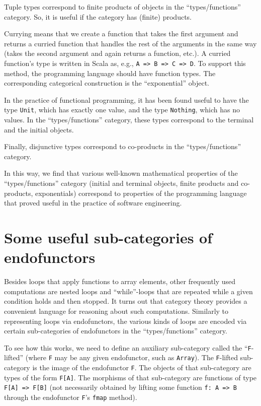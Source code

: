 Tuple types correspond to finite products of objects in the \textsf{``}types/functions\textsf{''}
category. So, it is useful if the category has (finite) products. 

Currying means that we create a function that takes the first argument
and returns a curried function that handles the rest of the arguments
in the same way (takes the second argument and again returns a function,
etc.). A curried function\textsf{'}s type is written in Scala as, e.g., \lstinline!A => B => C => D!.
To support this method, the programming language should have function
types. The corresponding categorical construction is the \textsf{``}exponential\textsf{''}
object. 

In the practice of functional programming, it has been found useful
to have the type \lstinline!Unit!, which has exactly one value, and
the type \lstinline!Nothing!, which has no values. In the \textsf{``}types/functions\textsf{''}
category, these types correspond to the terminal and the initial objects.

Finally, disjunctive types correspond to co-products in the \textsf{``}types/functions\textsf{''}
category.

In this way, we find that various well-known mathematical properties
of the \textsf{``}types/functions\textsf{''} category (initial and terminal objects,
finite products and co-products, exponentials) correspond to properties
of the programming language that proved useful in the practice of
software engineering.

\section{Some useful sub-categories of endofunctors}

Besides loops that apply functions to array elements, other frequently
used computations are nested loops and \textsf{``}while\textsf{''}-loops that are
repeated while a given condition holds and then stopped. It turns
out that category theory provides a convenient language for reasoning
about such computations. Similarly to representing loops via endofunctors,
the various kinds of loops are encoded via certain sub-categories
of endofunctors in the \textsf{``}types/functions\textsf{''} category.

To see how this works, we need to define an auxiliary sub-category
called the \textsf{``}\lstinline!F!-lifted\textsf{''} (where \lstinline!F! may be
any given endofunctor, such as \lstinline!Array!). The \lstinline!F!-lifted
sub-category is the image of the endofunctor \lstinline!F!. The objects
of that sub-category are types of the form \lstinline!F[A]!. The
morphisms of that sub-category are functions of type \lstinline!F[A] => F[B]!
(not necessarily obtained by lifting some function \lstinline!f: A => B!
through the endofunctor \lstinline!F!\textsf{'}s \lstinline!fmap! method). 

